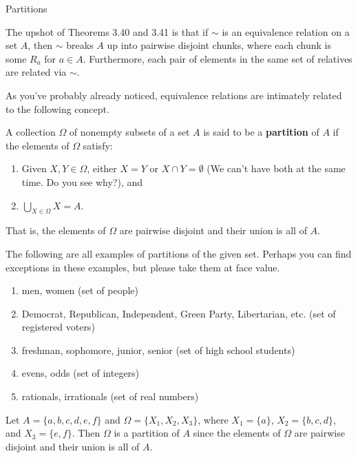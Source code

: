 \begin{section}{Partitions}

\begin{remark}
The upshot of Theorems 3.40 and 3.41 is that if $\sim$ is an equivalence relation on a set $A$, then $\sim$ breaks $A$ up into pairwise disjoint chunks, where each chunk is some $R_{a}$ for $a\in A$. Furthermore, each  pair of elements in the same set of relatives are related via $\sim$.
\end{remark}

As you've probably already noticed, equivalence relations are intimately related to the following concept.

\begin{definition}
A collection $\Omega$ of nonempty subsets of a set $A$ is said to be a \textbf{partition} of $A$ if the elements of $\Omega$ satisfy:
\begin{enumerate}
\item Given $X,Y\in\Omega$, either $X=Y$ or $X\cap Y=\emptyset$ (We can't have both at the same time. Do you see why?), and
\item $\displaystyle \bigcup_{X\in\Omega}X=A$.
\end{enumerate}
That is, the elements of $\Omega$ are pairwise disjoint and their union is all of $A$.
\end{definition}

\begin{example}
The following are all examples of partitions of the given set.  Perhaps you can find exceptions in these examples, but please take them at face value.
\begin{enumerate}
\item men, women (set of people)
\item Democrat, Republican, Independent, Green Party, Libertarian, etc. (set of registered voters)
\item freshman, sophomore, junior, senior (set of high school students)
\item evens, odds (set of integers)
\item rationals, irrationals (set of real numbers)
\end{enumerate}
\end{example}

\begin{example}\label{ex:a partition}
Let $A=\{a,b,c,d,e,f\}$ and $\Omega=\{X_{1},X_{2},X_{3}\}$, where $X_{1}=\{a\}$, $X_{2}=\{b,c,d\}$, and $X_{3}=\{e,f\}$.  Then $\Omega$ is a partition of $A$ since the elements of $\Omega$ are pairwise disjoint and their union is all of $A$.
\end{example}


\end{section}
